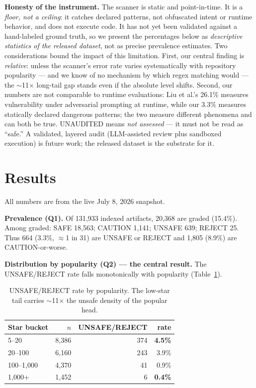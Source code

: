 \documentclass[11pt]{article}
\begin{document}
\textbf{Honesty of the instrument.} The scanner is static and point-in-time.
It is a \emph{floor, not a ceiling}: it catches declared patterns, not
obfuscated intent or runtime behavior, and does not execute code. It has not
yet been validated against a hand-labeled ground truth, so we present the
percentages below as \emph{descriptive statistics of the released dataset},
not as precise prevalence estimates. Two considerations bound the impact of
this limitation. First, our central finding is \emph{relative}: unless the
scanner's error rate varies systematically with repository popularity ---
and we know of no mechanism by which regex matching would --- the
$\sim$11$\times$ long-tail gap stands even if the absolute level shifts.
Second, our numbers are not comparable to runtime evaluations: Liu et al.'s
26.1\% measures vulnerability under adversarial prompting at runtime, while
our 3.3\% measures statically declared dangerous patterns; the two measure
different phenomena and can both be true. UNAUDITED means \emph{not
assessed} --- it must not be read as ``safe.'' A validated, layered audit
(LLM-assisted review plus sandboxed execution) is future work; the released
dataset is the substrate for it.

\section{Results}

All numbers are from the live July 8, 2026 snapshot.

\textbf{Prevalence (Q1).} Of 131,933 indexed artifacts, 20,368 are graded
(15.4\%). Among graded: SAFE 18,563; CAUTION 1,141; UNSAFE 639; REJECT 25.
Thus 664 (3.3\%, $\approx$1 in 31) are UNSAFE or REJECT and 1,805 (8.9\%) are
CAUTION-or-worse.

\textbf{Distribution by popularity (Q2) --- the central result.} The
UNSAFE/REJECT rate falls monotonically with popularity
(Table~\ref{tab:buckets}).

\begin{table}[h]
\centering
\begin{tabular}{lrrr}
\toprule
Star bucket & $n$ & UNSAFE/REJECT & rate \\
\midrule
5--20      & 8,386 & 374 & \textbf{4.5\%} \\
20--100    & 6,160 & 243 & 3.9\% \\
100--1,000 & 4,370 & 41  & 0.9\% \\
1,000+     & 1,452 & 6   & \textbf{0.4\%} \\
\bottomrule
\end{tabular}
\caption{UNSAFE/REJECT rate by popularity. The low-star tail carries
$\sim$11$\times$ the unsafe density of the popular head.}
\label{tab:buckets}
\end{table}
\end{document}
